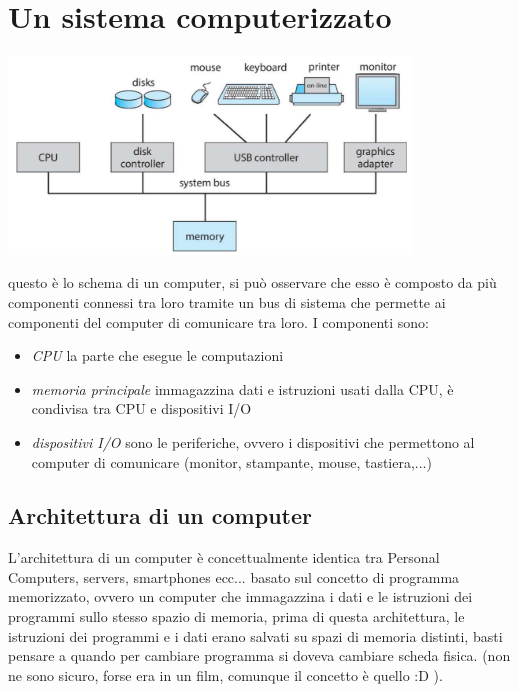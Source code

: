 \documentclass{article}
\begin{document}
\section{Un sistema computerizzato}

    {\centering \includegraphics[width=0.8\textwidth]{immagini/immagine.png}}
    
    questo è lo schema di un computer, si può osservare che esso è composto da più componenti connessi tra loro tramite un bus di sistema che permette ai componenti del computer di comunicare tra loro. I componenti sono:

    \begin{itemize}

        \item \textit{CPU}
         la parte che esegue le computazioni

        \item\textit{memoria principale}
        immagazzina dati e istruzioni usati dalla CPU, è condivisa tra CPU e dispositivi I/O

        \item\textit{dispositivi I/O}
        sono le periferiche, ovvero i dispositivi che permettono al computer di comunicare (monitor, stampante, mouse, tastiera,...)

    \end{itemize}

    
    \subsection{Architettura di un computer}
    L'architettura di un computer è concettualmente identica tra Personal Computers, servers, smartphones ecc... basato sul concetto di programma memorizzato, ovvero un computer che immagazzina i dati e le istruzioni dei programmi sullo stesso spazio di memoria, prima di questa architettura, le istruzioni dei programmi e i dati erano salvati su spazi di memoria distinti, basti pensare a quando per cambiare programma si doveva cambiare scheda fisica. (non ne sono sicuro, forse era in un film, comunque il concetto è quello :D ).
\end{document}
